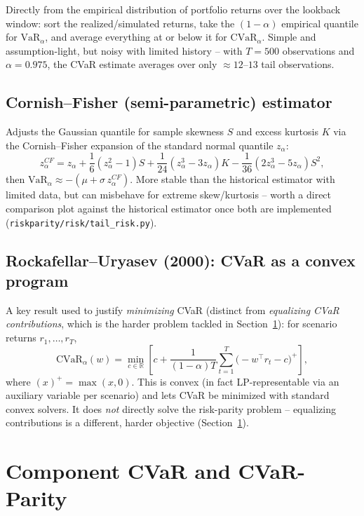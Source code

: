\documentclass[11pt]{article}
\newcommand{\Var}{\mathrm{VaR}}
\newcommand{\CVar}{\mathrm{CVaR}}
\begin{document}
Directly from the empirical distribution of portfolio returns over the
lookback window: sort the realized/simulated returns, take the
$(1-\alpha)$ empirical quantile for $\Var_\alpha$, and average everything
at or below it for $\CVar_\alpha$. Simple and assumption-light, but noisy
with limited history -- with $T=500$ observations and $\alpha = 0.975$,
the CVaR estimate averages over only $\approx 12$--$13$ tail
observations.

\subsection{Cornish--Fisher (semi-parametric) estimator}

Adjusts the Gaussian quantile for sample skewness $S$ and excess kurtosis
$K$ via the Cornish--Fisher expansion of the standard normal quantile
$z_\alpha$:
\[
z_\alpha^{CF} = z_\alpha + \frac{1}{6}(z_\alpha^2 - 1)S
+ \frac{1}{24}(z_\alpha^3 - 3z_\alpha)K
- \frac{1}{36}(2z_\alpha^3 - 5 z_\alpha)S^2,
\]
then $\Var_\alpha \approx -(\mu + \sigma \, z_\alpha^{CF})$. More stable
than the historical estimator with limited data, but can misbehave for
extreme skew/kurtosis -- worth a direct comparison plot against the
historical estimator once both are implemented
(\texttt{riskparity/risk/tail\_risk.py}).

\subsection{Rockafellar--Uryasev (2000): CVaR as a convex program}

A key result used to justify \emph{minimizing} CVaR (distinct from
\emph{equalizing CVaR contributions}, which is the harder problem tackled
in Section~\ref{sec:cvar-parity}): for scenario returns $r_1, \dots, r_T$,
\[
\CVar_\alpha(w) = \min_{c \in \mathbb{R}} \left[ c + \frac{1}{(1-\alpha) T} \sum_{t=1}^T \big(-w^\top r_t - c\big)^+ \right],
\]
where $(x)^+ = \max(x, 0)$. This is convex (in fact LP-representable via
an auxiliary variable per scenario) and lets CVaR be minimized with
standard convex solvers. It does \emph{not} directly solve the
risk-parity problem -- equalizing contributions is a different, harder
objective (Section~\ref{sec:cvar-parity}).

\section{Component CVaR and CVaR-Parity}
\label{sec:cvar-parity}
\end{document}
